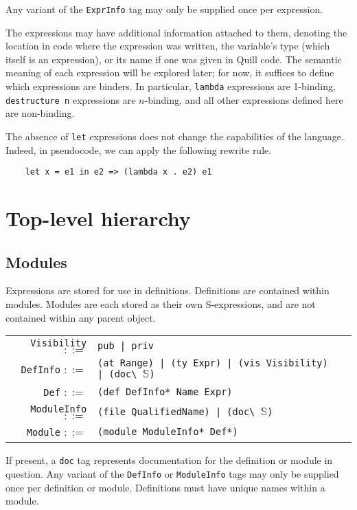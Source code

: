 \documentclass[UKenglish, 11pt, a4paper, parskip=half]{scrbook}
\newcommand{\code}[1]{\lstinline{#1}}
\theoremstyle{definition}
\begin{document}

Any variant of the \code{ExprInfo} tag may only be supplied once per expression.

The expressions may have additional information attached to them, denoting the location in code where the expression was written, the variable's type (which itself is an expression), or its name if one was given in Quill code.
The semantic meaning of each expression will be explored later; for now, it suffices to define which expressions are binders.
In particular, \code{lambda} expressions are 1-binding, \code{destructure n} expressions are \( n \)-binding, and all other expressions defined here are non-binding.

The absence of \code{let} expressions does not change the capabilities of the language.
Indeed, in pseudocode, we can apply the following rewrite rule.
\begin{lstlisting}
    let x = e1 in e2 => (lambda x . e2) e1
\end{lstlisting}

\section{Top-level hierarchy}

\subsection{Modules}

Expressions are stored for use in definitions.
Definitions are contained within modules.
Modules are each stored as their own S-expressions, and are not contained within any parent object.

\begin{tabular}{r l p{7cm}}
    \code{Visibility} \( ::= \) & \code{pub | priv} \\
    \code{DefInfo} \( ::= \) & \code{(at Range) | (ty Expr) | (vis Visibility) | (doc\ }\( \mathbb S \)\code{)} \\
    \code{Def} \( ::= \) & \code{(def DefInfo* Name Expr)} \\
    \code{ModuleInfo} \( ::= \) & \code{(file QualifiedName) | (doc\ }\( \mathbb S \)\code{)} \\
    \code{Module} \( ::= \) & \code{(module ModuleInfo* Def*)}
\end{tabular}

If present, a \code{doc} tag represents documentation for the definition or module in question.
Any variant of the \code{DefInfo} or \code{ModuleInfo} tags may only be supplied once per definition or module.
Definitions must have unique names within a module.
\end{document}
